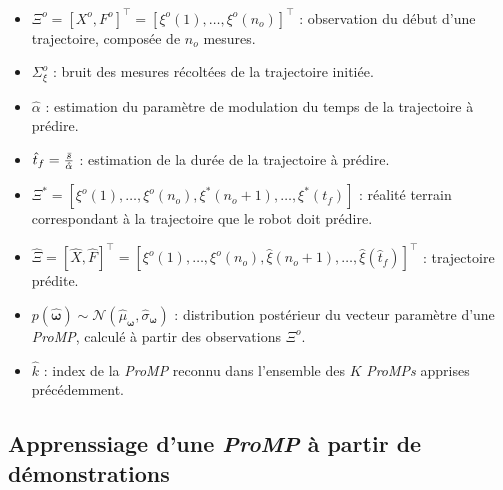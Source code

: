 \documentclass[utf8]{frontiersSCNS} %
\newcommand{\todo}[1]{\textcolor{red}{\textbf{/*#1*/}}}
\begin{document}
\begin{itemize}
\item $\Xi^o =[X^o, F^o]^\top = [\xi^o(1),\ldots, \xi^o(n_o)]^\top$ : observation du début d'une trajectoire, composée de $n_o$ mesures.
\item $\Sigma_\xi^o$ : bruit des mesures récoltées de la trajectoire initiée.
\item $\hat{\alpha}$ : estimation du paramètre de modulation du temps de la trajectoire à prédire.
\item $\hat{t}_f ={\bar{s} \over \hat{\alpha}}$ : estimation de la durée de la trajectoire à prédire.
\item $\Xi^* = [\xi^o(1),\ldots, \xi^o(n_o), \xi^*(n_o+1),\ldots, \xi^*(t_f)]$ : réalité terrain correspondant à la trajectoire que le robot doit prédire.
\item $\hat{\Xi} =[\hat{X}, \hat{F}]^\top = [\xi^o(1),\ldots, \xi^o(n_o), \hat{\xi}(n_o + 1),\ldots,\hat{\xi}(\hat{t}_f)]^\top$ : trajectoire prédite.
\item $p(\hat{\boldsymbol{\omega}}) \sim \mathcal{N}(\hat{\mu}_{\boldsymbol{\omega}}, \hat{\sigma}_{\boldsymbol{\omega}})$ : distribution postérieur du vecteur paramètre d'une \textit{ProMP}, calculé à partir des observations $\Xi^o$.
\item $\hat{k}$ : index de la \textit{ProMP} reconnu dans l'ensemble des $K$ \textit{ProMPs} apprises précédemment.
\end{itemize}


\subsection{Apprenssiage d'une \textit{ProMP} à partir de démonstrations}
\label{LearningSimpleProMP}
\end{document}
